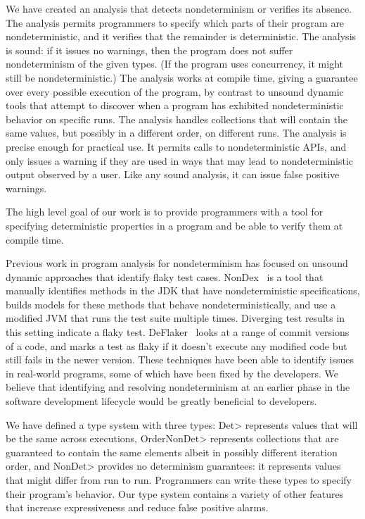 We have created an analysis that detects nondeterminism or verifies its
absence.
The analysis permits programmers to specify which parts of their program
are nondeterministic, and it verifies that the remainder is deterministic.
%
The analysis is sound:  if it issues no warnings, then the program does not
suffer nondeterminism of the given types.  (If the program uses concurrency,
it might still be nondeterministic.)
%
The analysis works at compile time, giving a guarantee over every possible
execution of the program, by contrast to unsound dynamic tools that attempt
to discover when a program has exhibited nondeterministic behavior on
specific runs.
%
The analysis handles collections that will contain the same values, but
possibly in a different order, on different runs.
%
The analysis is precise enough for practical use.  It permits calls to
nondeterministic APIs, and only issues a warning if they are used in ways
that may lead to nondeterministic output observed by a user.  Like any
sound analysis, it can issue false positive warnings.


The high level goal of our work is to provide programmers with a tool for
specifying deterministic properties in a program and be able to verify them
at compile time.


Previous work in program analysis for nondeterminism has focused on unsound dynamic
approaches that identify flaky test cases.
NonDex~\cite{nondex} is a tool that manually
identifies methods in the JDK that have nondeterministic specifications, builds models for
these methods that behave nondeterministically, and  use a modified JVM that runs the test suite multiple times.
Diverging test results in this setting indicate a flaky test. DeFlaker~\cite{deflaker} looks at a range of commit versions
of a code, and marks a test as flaky if it doesn't execute any modified code but still fails in the newer version. These techniques
have been able to identify issues in real-world programs, some of which
have been fixed by the developers. We believe that identifying and
resolving nondeterminism
at an earlier phase in the software development lifecycle would be greatly beneficial to
developers.

We have defined a type system with three types:
\<Det> represents values that will be the same across executions,
\<OrderNonDet> represents collections that are guaranteed to contain the same elements albeit in possibly
different iteration order, and
\<NonDet> provides no determinism guarantees:  it represents values that
might differ from run to run.
Programmers can write these types to specify their program's behavior.
Our type system contains a variety of other features that increase
expressiveness and reduce false positive alarms.

